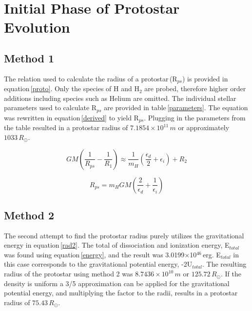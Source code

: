 \documentclass[onecolumn]{aastex6}
\begin{document}

\section{Initial Phase of Protostar Evolution}
\subsection{Method 1}
The relation used to calculate the radius of a protostar\,(R$_{ps}$) is provided in equation\,\ref{proto}. Only the species of H and H$_2$ are probed, therefore higher order additions including species such as Helium are omitted. The individual stellar parameters used to calculate R$_{ps}$ are provided in table\,\ref{parameters}. The equation was rewritten in equation\,\ref{derived} to yield R$_{ps}$. Plugging in the parameters from the table resulted in a protostar radius of \st{$\boxed{7.1854\times10^{11}\,m}$} or approximately \st{$\boxed{1033\,R_\odot}$}.



\begin{equation}
GM\left(\frac{1}{R_{ps}}-\frac{1}{R_1}\right)\approx \frac{1}{m_H}\left(\frac{\epsilon_d}{2} + \epsilon_i\right)+R_2
\label{proto}
\end{equation}

\begin{equation}
R_{ps} = m_H G M \left(\frac{2}{\epsilon_d} + \frac{1}{\epsilon_i}\right)
\label{derived}
\end{equation}

\subsection{Method 2}
The second attempt to find the protostar radius purely utilizes the gravitational energy in equation\,\ref{rad2}. The total of dissociation and ionization energy, E$_{total}$ was found using equation\,\ref{energy}, and the result was 3.0199$\times$10$^{46}$\,erg. E$_{total}$ in this case corresponds to the gravitational potential energy, -2U$_{total}$. The resulting radius of the protostar using method 2 was $\boxed{8.7436\times10^{10}\,m}$ or $\boxed{125.72\,R_\odot}$. If the density is uniform a 3/5 approximation can be applied for the gravitational potential energy, and multiplying the factor to the radii, results in a protostar radius of $\boxed{75.43\,R_\odot}$.
\end{document}
